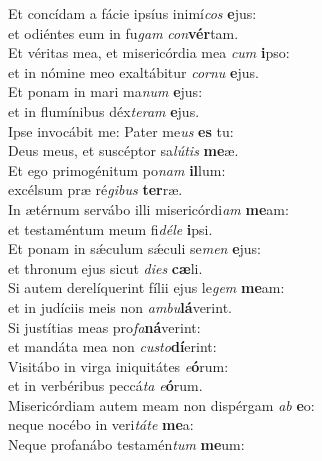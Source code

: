 \oddverse Et concídam a fácie ipsíus inimí\textit{cos} \textbf{e}jus:~\*\\
\oddverse et odiéntes eum in fu\textit{gam} \textit{con}\textbf{vér}tam.\\
\evenverse Et véritas mea, et misericórdia mea \textit{cum} \textbf{i}pso:~\*\\
\evenverse et in nómine meo exaltábitur \textit{cor}\textit{nu} \textbf{e}jus.\\
\oddverse Et ponam in mari ma\textit{num} \textbf{e}jus:~\*\\
\oddverse et in flumínibus déx\textit{te}\textit{ram} \textbf{e}jus.\\
\evenverse Ipse invocábit me: Pater me\textit{us} \textbf{es} tu:~\*\\
\evenverse Deus meus, et suscéptor sa\textit{lú}\textit{tis} \textbf{me}æ.\\
\oddverse Et ego primogénitum po\textit{nam} \textbf{il}lum:~\*\\
\oddverse excélsum præ ré\textit{gi}\textit{bus} \textbf{ter}ræ.\\
\evenverse In ætérnum servábo illi misericórdi\textit{am} \textbf{me}am:~\*\\
\evenverse et testaméntum meum fi\textit{dé}\textit{le} \textbf{i}psi.\\
\oddverse Et ponam in sǽculum sǽculi se\textit{men} \textbf{e}jus:~\*\\
\oddverse et thronum ejus sicut \textit{di}\textit{es} \textbf{cæ}li.\\
\evenverse Si autem derelíquerint fílii ejus le\textit{gem} \textbf{me}am:~\*\\
\evenverse et in judíciis meis non \textit{am}\textit{bu}\textbf{lá}verint.\\
\oddverse Si justítias meas pro\textit{fa}\textbf{ná}verint:~\*\\
\oddverse et mandáta mea non \textit{cu}\textit{sto}\textbf{dí}erint:\\
\evenverse Visitábo in virga iniquitátes \textit{e}\textbf{ó}rum:~\*\\
\evenverse et in verbéribus peccá\textit{ta} \textit{e}\textbf{ó}rum.\\
\oddverse Misericórdiam autem meam non dispérgam \textit{ab} \textbf{e}o:~\*\\
\oddverse neque nocébo in veri\textit{tá}\textit{te} \textbf{me}a:\\
\evenverse Neque profanábo testamén\textit{tum} \textbf{me}um:~\*\\
